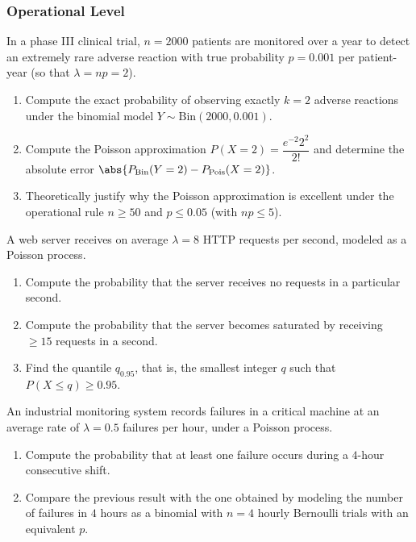 \subsubsection*{Operational Level}

\begin{problema}
	\label{prob:3.7.4}
	In a phase III clinical trial, $n = 2000$ patients are monitored over a year to detect an extremely rare adverse reaction with true probability $p = 0.001$ per patient-year (so that $\lambda = np = 2$).
	\begin{enumerate}
		\item Compute the exact probability of observing exactly $k = 2$ adverse reactions under the binomial model $Y \sim \text{Bin}(2000, 0.001)$.
		\item Compute the Poisson approximation $P(X = 2) = \dfrac{e^{-2} 2^{2}}{2!}$ and determine the absolute error $\abs{P_{\text{Bin}}(Y=2) - P_{\text{Pois}}(X=2)}$.
		\item Theoretically justify why the Poisson approximation is excellent under the operational rule $n \ge 50$ and $p \le 0.05$ (with $np \le 5$).
	\end{enumerate}
\end{problema}

\begin{problema}
	\label{prob:3.7.5}
	A web server receives on average $\lambda = 8$ HTTP requests per second, modeled as a Poisson process.
	\begin{enumerate}
		\item Compute the probability that the server receives no requests in a particular second.
		\item Compute the probability that the server becomes saturated by receiving $\ge 15$ requests in a second.
		\item Find the quantile $q_{0.95}$, that is, the smallest integer $q$ such that $P(X \le q) \ge 0.95$.
	\end{enumerate}
\end{problema}

\begin{problema}
	\label{prob:3.7.6}
	An industrial monitoring system records failures in a critical machine at an average rate of $\lambda = 0.5$ failures per hour, under a Poisson process.
	\begin{enumerate}
		\item Compute the probability that at least one failure occurs during a $4$-hour consecutive shift.
		\item Compare the previous result with the one obtained by modeling the number of failures in $4$ hours as a binomial with $n = 4$ hourly Bernoulli trials with an equivalent $p$.
	\end{enumerate}
\end{problema}

